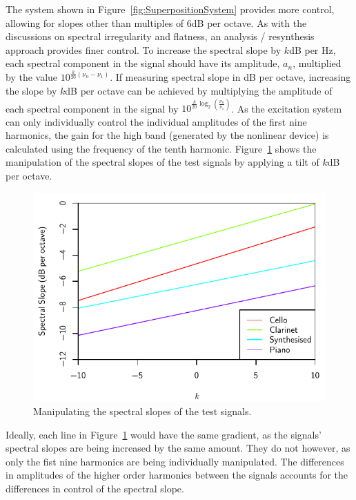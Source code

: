 		The system shown in Figure~\ref{fig:SuperpositionSystem} provides more control, allowing for slopes other
		than multiples of 6dB per octave. As with the discussions on spectral irregularity and flatness, an
		analysis / resynthesis approach provides finer control. To increase the spectral slope by $k$dB per Hz,
		each spectral component in the signal should have its amplitude, $a_{n}$, multiplied by the value
		$10^{\frac{k}{20}(\nu_{n} - \nu_{1})}$. If measuring spectral slope in dB per octave, increasing the slope
		by $k$dB per octave can be achieved by multiplying the amplitude of each spectral component in the signal
		by $10^{\frac{k}{20}\log_{2} \left( \frac{\nu_{n}}{\nu_{1}} \right)}$. As the excitation system can only
		individually control the individual amplitudes of the first nine harmonics, the gain for the high band
		(generated by the nonlinear device) is calculated using the frequency of the tenth harmonic.
		Figure~\ref{fig:MoveSlopes} shows the manipulation of the spectral slopes of the test signals by applying a
		tilt of $k$dB per octave.

		\begin{figure}[h!]
			\centering
			\includegraphics{chapter6/Images/MoveSlopes.pdf}
			\caption{Manipulating the spectral slopes of the test signals.}
			\label{fig:MoveSlopes}
		\end{figure}

		Ideally, each line in Figure~\ref{fig:MoveSlopes} would have the same gradient, as the signals' spectral
		slopes are being increased by the same amount. They do not however, as only the fist nine harmonics are
		being individually manipulated. The differences in amplitudes of the higher order harmonics between the
		signals accounts for the differences in control of the spectral slope.

